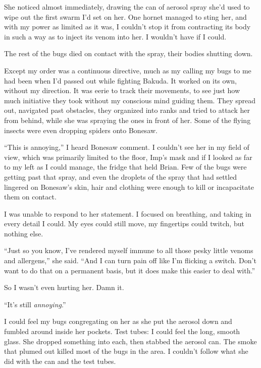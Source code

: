 She noticed almost immediately, drawing the can of aerosol spray she'd used to wipe out the first swarm I'd set on her.  One hornet managed to sting her, and with my power as limited as it was, I couldn't stop it from contracting its body in such a way as to inject its venom into her.  I wouldn't have if I could.



The rest of the bugs died on contact with the spray, their bodies shutting down.



Except my order was a continuous directive, much as my calling my bugs to me had been when I'd passed out while fighting Bakuda.  It worked on its own, without my direction.  It was eerie to track their movements, to see just how much initiative they took without my conscious mind guiding them.  They spread out, navigated past obstacles, they organized into ranks and tried to attack her from behind, while she was spraying the ones in front of her.  Some of the flying insects were even dropping spiders onto Bonesaw.



``This is annoying,'' I heard Bonesaw comment.  I couldn't see her in my field of view, which was primarily limited to the floor, Imp's mask and if I looked as far to my left as I could manage, the fridge that held Brian.  Few of the bugs were getting past that spray, and even the droplets of the spray that had settled lingered on Bonesaw's skin, hair and clothing were enough to kill or incapacitate them on contact.



I was unable to respond to her statement.  I focused on breathing, and taking in every detail I could.  My eyes could still move, my fingertips could twitch, but nothing else.



``Just so you know, I've rendered myself immune to all those pesky little venoms and allergens,'' she said.  ``And I can turn pain off like I'm flicking a switch.  Don't want to do that on a permanent basis, but it does make this easier to deal with.''



So I wasn't even hurting her.  Damn it.



``It's still \emph{annoying}.''



I could feel my bugs congregating on her as she put the aerosol down and fumbled around inside her pockets.  Test tubes: I could feel the long, smooth glass. She dropped something into each, then stabbed the aerosol can.  The smoke that plumed out killed most of the bugs in the area.  I couldn't follow what she did with the can and the test tubes.



